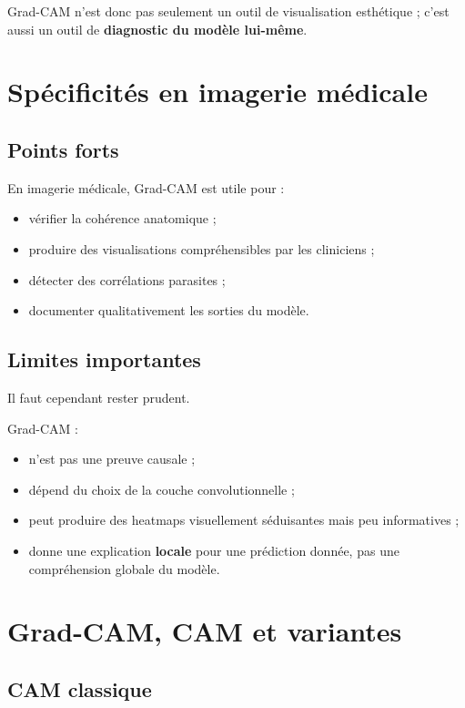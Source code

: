 ﻿\documentclass[11pt,a4paper]{article}
\begin{document}
Grad-CAM n'est donc pas seulement un outil de visualisation esthétique ; c'est aussi un outil de \textbf{diagnostic du modèle lui-même}.

\section{Spécificités en imagerie médicale}

\subsection{Points forts}

En imagerie médicale, Grad-CAM est utile pour :
\begin{itemize}
    \item vérifier la cohérence anatomique ;
    \item produire des visualisations compréhensibles par les cliniciens ;
    \item détecter des corrélations parasites ;
    \item documenter qualitativement les sorties du modèle.
\end{itemize}

\subsection{Limites importantes}

Il faut cependant rester prudent.

Grad-CAM :
\begin{itemize}
    \item n'est pas une preuve causale ;
    \item dépend du choix de la couche convolutionnelle ;
    \item peut produire des heatmaps visuellement séduisantes mais peu informatives ;
    \item donne une explication \textbf{locale} pour une prédiction donnée, pas une compréhension globale du modèle.
\end{itemize}

\section{Grad-CAM, CAM et variantes}

\subsection{CAM classique}
\end{document}
